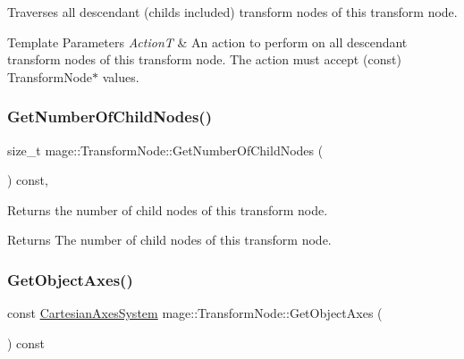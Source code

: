 Traverses all descendant (childs included) transform nodes of this transform node.


\begin{DoxyTemplParams}{Template Parameters}
{\em ActionT} & An action to perform on all descendant transform nodes of this transform node. The action must accept ({\ttfamily const}) {\ttfamily Transform\+Node$\ast$} values. \\
\hline
\end{DoxyTemplParams}
\hypertarget{structmage_1_1_transform_node_a3efc0401cee8fc6215148963ce3e8227}{}\label{structmage_1_1_transform_node_a3efc0401cee8fc6215148963ce3e8227} 
\subsubsection{\texorpdfstring{Get\+Number\+Of\+Child\+Nodes()}{GetNumberOfChildNodes()}}
{\footnotesize\ttfamily size\+\_\+t mage\+::\+Transform\+Node\+::\+Get\+Number\+Of\+Child\+Nodes (\begin{DoxyParamCaption}{ }\end{DoxyParamCaption}) const\hspace{0.3cm}{\ttfamily [private]}, {\ttfamily [noexcept]}}

Returns the number of child nodes of this transform node.

\begin{DoxyReturn}{Returns}
The number of child nodes of this transform node. 
\end{DoxyReturn}
\hypertarget{structmage_1_1_transform_node_a3e6b79b7e1a0844d8f93acaecdf65346}{}\label{structmage_1_1_transform_node_a3e6b79b7e1a0844d8f93acaecdf65346} 
\subsubsection{\texorpdfstring{Get\+Object\+Axes()}{GetObjectAxes()}}
{\footnotesize\ttfamily const \hyperlink{structmage_1_1_cartesian_axes_system}{Cartesian\+Axes\+System} mage\+::\+Transform\+Node\+::\+Get\+Object\+Axes (\begin{DoxyParamCaption}{ }\end{DoxyParamCaption}) const\hspace{0.3cm}{\ttfamily [noexcept]}}


